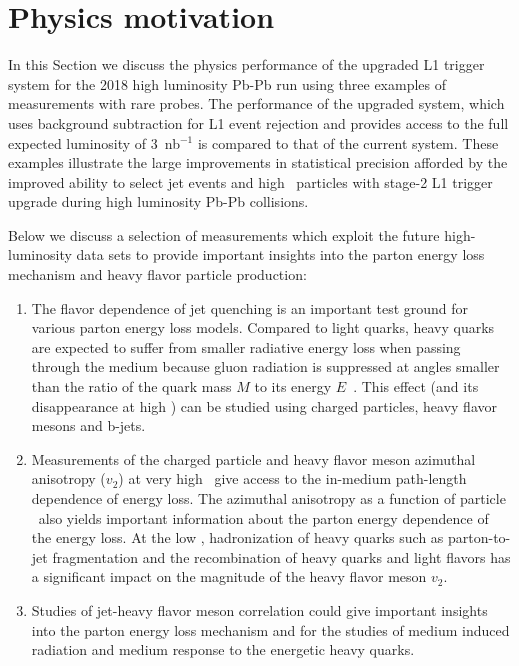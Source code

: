 \section{Physics motivation\label{sec:physHI}}
\label{sec:physics}

In this Section we discuss the physics performance of the upgraded L1 trigger system for the 2018 high luminosity Pb-Pb run using three examples of measurements with rare probes. The performance of the upgraded system, which uses background subtraction for L1 event rejection and provides access to the full expected luminosity of 3~nb$^{-1}$ is compared to that of the current system. 
These examples illustrate the large improvements in statistical precision afforded by the improved ability to select jet events and high \pt\ particles with stage-2 L1 trigger upgrade during high luminosity Pb-Pb collisions. 

Below we discuss a selection of measurements which exploit the future high-luminosity data sets to 
provide important insights into the parton energy loss mechanism and heavy flavor particle production:

\begin{enumerate}
\item The flavor dependence of jet quenching is an important test ground for various parton energy loss models. 
Compared to light quarks, heavy quarks are expected to suffer from smaller radiative energy loss when passing through the medium because gluon radiation is suppressed at angles smaller than the ratio of the quark mass $M$ to its energy $E$~\cite{Dokshitzer:2001zm}. This effect (and its disappearance at high \pt) can be studied using charged particles, heavy flavor mesons and b-jets.
\item Measurements of the charged particle and heavy flavor meson azimuthal anisotropy ($v_2$) at very high \pt\ give access to the in-medium path-length 
dependence of energy loss. The azimuthal anisotropy as a function of particle \pt\ also yields important information about the parton energy dependence of the energy loss.  At the low \pt, hadronization of heavy quarks such as parton-to-jet fragmentation and the recombination of heavy quarks and light flavors has a significant impact on the magnitude of the heavy flavor meson $v_2$. 
\item Studies of jet-heavy flavor meson correlation could give important insights into the parton energy loss mechanism and for the studies of medium induced radiation and medium response to the energetic heavy quarks.
\end{enumerate}

